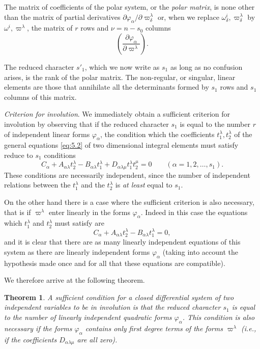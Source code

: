 \documentclass[leqno,11pt]{book}
\numberwithin{equation}{chapter}
\newcommand{\pd}{\partial}
\theoremstyle{shape1}
\newtheorem*{thm*}{\hspace{15pt}Theorem}
\theoremstyle{shape0}
\theoremstyle{shape2}
\theoremstyle{definition}
\begin{document}
The matrix of coefficients of the polar system, or the \emph{polar matrix}, is none other than the matrix of partial derivatives $\pd \varphi_{\alpha}/\pd \varpi^{\lambda}_{\delta}$ or, when we replace $\omega^{i}_{\delta},\varpi^{\lambda}_{\delta}$ by $\omega^{i},\varpi^{\lambda}$, the matrix of $r$ rows and $\nu=n-s_{0}$ columns
\begin{equation}
  \label{eq:5.5}
  \left(\frac{\pd \varphi_{\alpha}}{\pd \varpi^{\lambda}}\right).
\end{equation}

The reduced character $s'_{1}$, which we now write as $s_{1}$ as long as no confusion arises, is the rank of the polar matrix. The non-regular, or singular, linear elements are those that annihilate all the determinants formed by $s_{1}$ rows and $s_{1}$ columns of this matrix.

\vspace{12pt}\fsec \emph{Criterion for involution}. We immediately obtain a sufficient criterion for involution by observing that if the reduced character $s_{1}$ is equal to the number $r$ of independent linear  forms $\varphi_{\alpha}$, the condition which the coefficients $t_{1}^{\lambda},t_{2}^{\lambda}$ of the general equations \eqref{eq:5.2} of two dimensional integral elements must satisfy reduce to $s_{1}$ conditions
\[
C_{\alpha}+A_{\alpha\lambda}t_{2}^{\lambda}-B_{\alpha\lambda}t_{1}^{\lambda}+D_{\alpha\lambda\mu}t_{1}^{\lambda}t_{2}^{\mu}=0\qquad(\alpha=1,2,\dots,s_{1}).
\]
These conditions are necessarily independent, since the number of independent relations between the $t_{1}^{\lambda}$ and the $t_{2}^{\lambda}$ is \emph{at least} equal to $s_{1}$.

On the other hand there is a case where the sufficient criterion is also necessary, that is if $\varpi^{\lambda}$ enter linearly  in the forms $\varphi_{\alpha}$. Indeed in this case the equations which $t_{1}^{\lambda}$ and $t_{2}^{\lambda}$ must satisfy are
\[
C_{\alpha}+A_{\alpha\lambda}t_{2}^{\lambda}-B_{\alpha\lambda}t_{1}^{\lambda}=0,
\]
and it is clear that there are as many linearly independent equations of this system as there are linearly independent forms $\varphi_{\alpha}$ (taking into account the hypothesis made once and for all that these equations are compatible).

We therefore arrive at the following theorem.
\begin{thm*}
  A sufficient condition for a closed differential system of two independent variables to be in involution is that the reduced character $s_{1}$ is equal to the number of linearly independent quadratic forms $\varphi_{\alpha}$. This condition is also necessary if the forms $\varphi_{\alpha}$ contains only first degree terms of the forms $\varpi^{\lambda}$ (i.e., if the coefficients $D_{\alpha\lambda\mu}$ are all zero).
\end{thm*}
\end{document}
